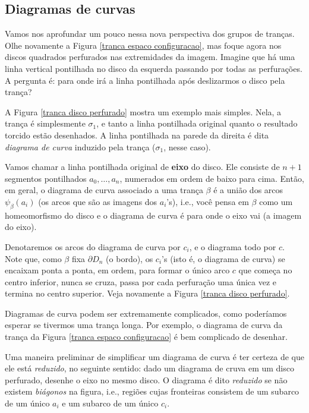 \documentclass[a4paper,portuguese,11pt,twoside, leqno]{book}
\theoremstyle{definition}
\begin{document}
	\subsection{Diagramas de curvas}
	\hspace{12pt} Vamos nos aprofundar um pouco nessa nova perspectiva dos grupos de tranças. Olhe novamente a Figura \eqref{tranca espaco configuracao}, mas foque agora nos discos quadrados perfurados nas extremidades da imagem. Imagine que há uma linha vertical pontilhada no disco da esquerda passando por todas as perfurações. A pergunta é: para onde irá a linha pontilhada após deslizarmos o disco pela trança?
	\par\vspace{0.3cm} A Figura \eqref{tranca disco perfurado} mostra um exemplo mais simples. Nela, a trança é simplesmente $\sigma_1$, e tanto a linha pontilhada original quanto o resultado torcido estão desenhados. A linha pontilhada na parede da direita é dita \textit{diagrama de curva} induzido pela trança ($\sigma_1$, nesse caso). 
	\par\vspace{0.3cm} Vamos chamar a linha pontilhada original de \textbf{eixo} do disco. Ele consiste de $n+1$ segmentos pontilhados $a_0, \dots, a_n$, numerados em ordem de baixo para cima. Então, em geral, o diagrama de curva associado a uma trança $\beta$ é a união dos arcos $\psi_{\beta}(a_i)$ (os arcos que são as imagens dos $a_i$'s), i.e., você pensa em $\beta$ como um homeomorfismo do disco e o diagrama de curva é para onde o eixo vai (a imagem do eixo). 
	\par\vspace{0.3cm} Denotaremos os arcos do diagrama de curva por $c_i$, e o diagrama todo por $c$. Note que, como $\beta$ fixa $\partial D_n$ (o bordo), os $c_i$'s (isto é, o diagrama de curva) se encaixam ponta a ponta, em ordem, para formar o único arco $c$ que começa no centro inferior, nunca se cruza, passa por cada perfuração uma única vez e termina no centro superior. Veja novamente a Figura \eqref{tranca disco perfurado}.  
	\par\vspace{0.3cm} Diagramas de curva podem ser extremamente complicados, como poderíamos esperar se tivermos uma trança longa. Por exemplo, o diagrama de curva da trança da Figura \eqref{tranca espaco configuracao} é bem complicado de desenhar. 
	\par\vspace{0.3cm} Uma maneira preliminar de simplificar um diagrama de curva é ter certeza de que ele está \textit{reduzido}, no seguinte sentido: dado um diagrama de cruva em um disco perfurado, desenhe o eixo no mesmo disco. O diagrama é dito \textit{reduzido} se não existem \textit{biágonos} na figura, i.e., regiões cujas fronteiras consistem de um subarco de um único $a_i$ e um subarco de um único $c_i$. 
\end{document}
